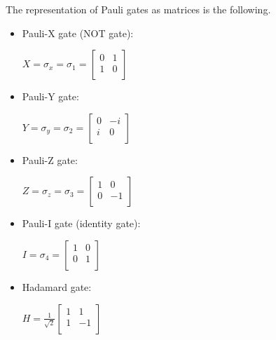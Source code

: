 \documentclass[inscr,ack,preface]{diphdthesis}
\begin{document}
The representation of Pauli gates as matrices is the following.\cite{nielgates}
\begin{itemize}
    \item Pauli-X gate (NOT gate):
    \begin{center}
    \Large
        $X = \sigma_x = \sigma_1 = 
        \begin{bmatrix}
            0 & 1 \\
            1 & 0 \\
        \end{bmatrix}$
    \end{center}
    \normalsize
    \item Pauli-Y gate:
    \begin{center}
    \Large
        $Y = \sigma_y = \sigma_2 = 
        \begin{bmatrix}
            0 & -i \\
            i & 0 \\
        \end{bmatrix}$
    \end{center}
    \normalsize
    \item Pauli-Z gate:
    \begin{center}
    \Large
        $Z = \sigma_z = \sigma_3 = 
        \begin{bmatrix}
            1 & 0 \\
            0 & -1 \\
        \end{bmatrix}$
    \end{center}
    \normalsize
    \item Pauli-I gate (identity gate):
    \begin{center}
    \Large
        $I =  \sigma_4 = 
        \begin{bmatrix}
            1 & 0 \\
            0 & 1 \\
        \end{bmatrix}$
    \end{center}
    \item Hadamard gate:
    \begin{center}
    \Large
        $H = \frac{1}{\sqrt{2}}\begin{bmatrix}
            1 & 1 \\
            1 & -1 \\
            \end{bmatrix}$
    \end{center}
    
\end{itemize}
\end{document}
